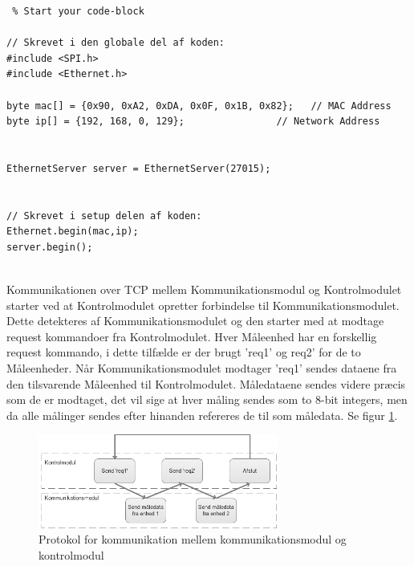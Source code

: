 \begin{lstlisting} % Start your code-block

// Skrevet i den globale del af koden:
#include <SPI.h>
#include <Ethernet.h>

byte mac[] = {0x90, 0xA2, 0xDA, 0x0F, 0x1B, 0x82};   // MAC Address
byte ip[] = {192, 168, 0, 129};                // Network Address


EthernetServer server = EthernetServer(27015);


// Skrevet i setup delen af koden:
Ethernet.begin(mac,ip);
server.begin();


\end{lstlisting}


Kommunikationen over TCP mellem Kommunikationsmodul og Kontrolmodulet starter ved at Kontrolmodulet opretter forbindelse til Kommunikationsmodulet. Dette detekteres af Kommunikationsmodulet og den starter med at modtage request kommandoer fra Kontrolmodulet. Hver Måleenhed har en forskellig request kommando, i dette tilfælde er der brugt 'req1' og req2' for de to Måleenheder. Når Kommunikationsmodulet modtager 'req1' sendes dataene fra den tilsvarende Måleenhed til Kontrolmodulet. Måledataene sendes videre præcis som de er modtaget, det vil sige at hver måling sendes som to 8-bit integers, men da alle målinger sendes efter hinanden refereres de til som måledata. Se figur \ref{fig:TCPProtokol}.

\begin{figure}[H] %
	\centering
	\includegraphics[width=0.7\textwidth]{Figure/TCPProtokol}
	\caption{Protokol for kommunikation mellem kommunikationsmodul og kontrolmodul}
	\label{fig:TCPProtokol}
\end{figure}



